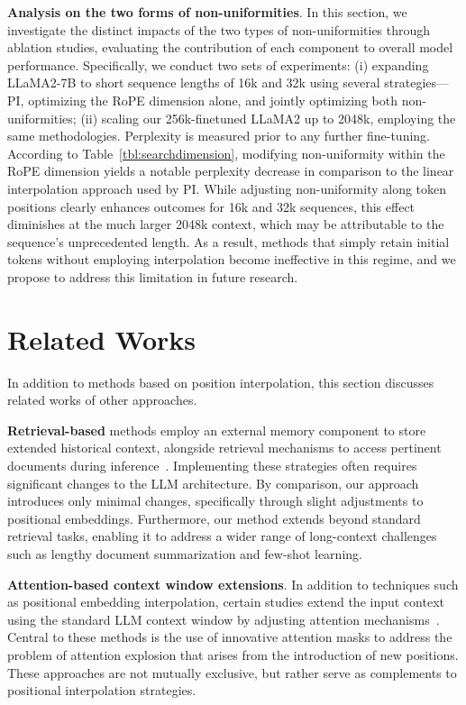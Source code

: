 \textbf{Analysis on the two forms of non-uniformities}. In this section, we investigate the distinct impacts of the two types of non-uniformities through ablation studies, evaluating the contribution of each component to overall model performance. Specifically, we conduct two sets of experiments: (i) expanding LLaMA2-7B to short sequence lengths of 16k and 32k using several strategies—PI, optimizing the RoPE dimension alone, and jointly optimizing both non-uniformities; (ii) scaling our 256k-finetuned LLaMA2 up to 2048k, employing the same methodologies. Perplexity is measured prior to any further fine-tuning. According to Table~\ref{tbl:searchdimension}, modifying non-uniformity within the RoPE dimension yields a notable perplexity decrease in comparison to the linear interpolation approach used by PI. While adjusting non-uniformity along token positions clearly enhances outcomes for 16k and 32k sequences, this effect diminishes at the much larger 2048k context, which may be attributable to the sequence's unprecedented length. As a result, methods that simply retain initial tokens without employing interpolation become ineffective in this regime, and we propose to address this limitation in future research.

\section{Related Works}

In addition to methods based on position interpolation, this section discusses related works of other approaches. 

\textbf{Retrieval-based} methods employ an external memory component to store extended historical context, alongside retrieval mechanisms to access pertinent documents during inference~\cite{longllama,wang2023augmenting,borgeaud2022improving}. Implementing these strategies often requires significant changes to the LLM architecture. By comparison, our approach introduces only minimal changes, specifically through slight adjustments to positional embeddings. Furthermore, our method extends beyond standard retrieval tasks, enabling it to address a wider range of long-context challenges such as lengthy document summarization and few-shot learning.

\textbf{Attention-based context window extensions}. In addition to techniques such as positional embedding interpolation, certain studies extend the input context using the standard LLM context window by adjusting attention mechanisms~\cite{han2023lminfinite, streamingllm,parallelwindow}. Central to these methods is the use of innovative attention masks to address the problem of attention explosion that arises from the introduction of new positions. These approaches are not mutually exclusive, but rather serve as complements to positional interpolation strategies.

